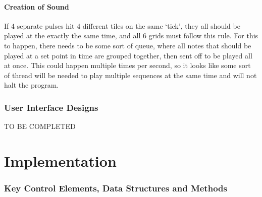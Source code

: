 \documentclass[10pt,a4paper]{article}
\begin{document}
\subsection{Creation of Sound}
If 4 separate pulses hit 4 different tiles on the same ‘tick’, they all should be played at the exactly the same time, and all 6 grids must follow this rule. For this to happen, there needs to be some sort of queue, where all notes that should be played at a set point in time are grouped together, then sent off to be played all at once. This could happen multiple times per second, so it looks like some sort of thread will be needed to play multiple sequences at the same time and will not halt the program.

\section{User Interface Designs}
TO BE COMPLETED

\part{Implementation}
\section{Key Control Elements, Data Structures and Methods}
\end{document}
